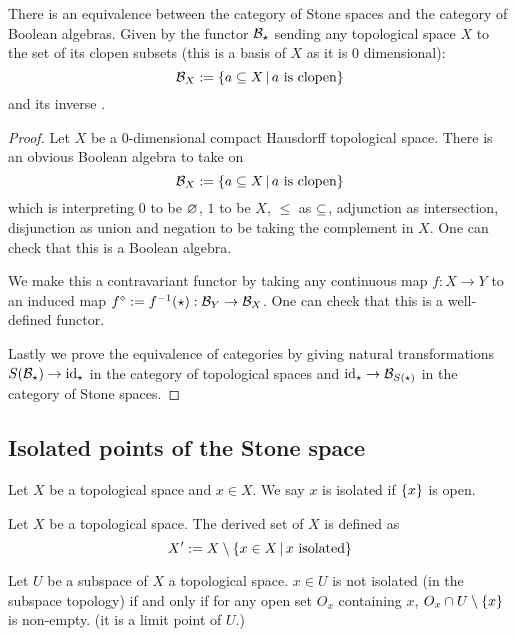 \begin{prop}%
    There is an equivalence between the category of Stone
    spaces and the category of Boolean algebras.
    Given by the functor $\mathcal{B}_\star$ 
    sending any topological space $X$ to the set of 
    its clopen subsets (this is a basis of $X$ as it is $0$ dimensional):
    \[\mathcal{B}_X := \left\{a \subseteq X \,|\, a \text{ is clopen}\right\}\]
    and its inverse  .
\end{prop}
\begin{proof}
    Let $X$ be a $0$-dimensional compact Hausdorff topological space.
    There is an obvious Boolean algebra to take on 
    \[\mathcal{B}_X := \left\{a \subseteq X \,|\, a \text{ is clopen}\right\}\]
    which is interpreting $0$ to be $\varnothing$, $1$ to be $X$, 
    $\leq$ as $\subseteq$,
    adjunction as intersection, disjunction as union and negation to be 
    taking the complement in $X$.
    One can check that this is a Boolean algebra.

    We make this a contravariant functor by taking any continuous map 
    $f : X \to Y$
    to an induced map $f^{\diamond}:= f^{-1}(\star):\mathcal{B}_Y \to \mathcal{B}_X$.
    One can check that this is a well-defined functor.

    Lastly we prove the equivalence of categories by giving 
    natural transformations $S(\mathcal{B}_{\star}) \to \mathrm{id}_{\star}$ in
    the category of topological spaces
    and $\mathrm{id}_{\star} \to \mathcal{B}_{S(\star)}$ in the category of Stone spaces.
\end{proof}

\subsection{Isolated points of the Stone space}
\begin{dfn}
    Let $X$ be a topological space and $x \in X$. 
    We say $x$ is isolated if $\left\{x\right\}$ is open.
\end{dfn}

\begin{dfn}
    Let $X$ be a topological space. 
    The derived set of $X$ is defined as
    \[X' : = X \setminus \left\{x \in X \,|\, x \text{ isolated}\right\}\]
\end{dfn}

\begin{ex}
    Let $U$ be a subspace of $X$ a topological space.
    $x \in U$ is not isolated (in the subspace topology) if and only if 
    for any open set $O_x$ containing $x$, 
    $O_x \cap U \setminus \left\{x\right\}$ is non-empty. 
    (it is a limit point of $U$.)
\end{ex}


